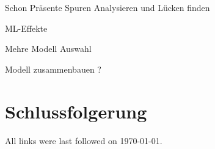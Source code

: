 \documentclass[
  a4paper,  %
  twoside,  %
  bibliography=totoc,
  headsepline,
  cleardoublepage=empty,
  parskip=half,
  draft=false
]{scrbook}
\begin{document}
Schon Präsente Spuren Analysieren und Lücken finden 

ML-Effekte

Mehre Modell Auswahl 

Modell zusammenbauen ? 





\chapter{Schlussfolgerung}
\label{sec:conclusion}


\printbibliography

All links were last followed on \today{}.

\appendix
%

\pagestyle{empty}
\renewcommand*{\chapterpagestyle}{empty}
\Affirmation
\end{document}
